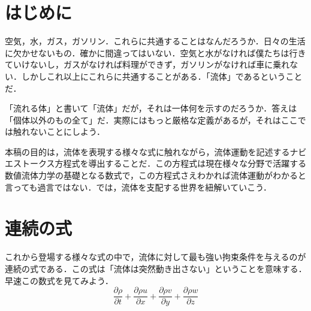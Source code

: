 \documentclass{jsarticle}
\newcommand{\pfrac}[2]{\frac{\partial{}{#1}}{\partial{}{#2}}}
\begin{document}
\section{はじめに}
空気，水，ガス，ガソリン．これらに共通することはなんだろうか．日々の生活に欠かせないもの．確かに間違ってはいない．空気と水がなければ僕たちは行きていけないし，ガスがなければ料理ができず，ガソリンがなければ車に乗れない．しかしこれ以上にこれらに共通することがある．「流体」であるということだ．

「流れる体」と書いて「流体」だが，それは一体何を示すのだろうか．答えは「個体以外のもの全て」だ．実際にはもっと厳格な定義があるが，それはここでは触れないことにしよう．

本稿の目的は，流体を表現する様々な式に触れながら，流体運動を記述するナビエストークス方程式を導出することだ．この方程式は現在様々な分野で活躍する数値流体力学の基礎となる数式で，この方程式さえわかれば流体運動がわかると言っても過言ではない．では，流体を支配する世界を紐解いていこう．

\section{連続の式}
これから登場する様々な式の中で，流体に対して最も強い拘束条件を与えるのが連続の式である．この式は「流体は突然動き出さない」ということを意味する．早速この数式を見てみよう．
\begin{equation}
\pfrac{\rho}{t}+\pfrac{\rho{}u}{x}+\pfrac{\rho{}v}{y}+\pfrac{\rho{}w}{z}
\end{equation}
\end{document}
